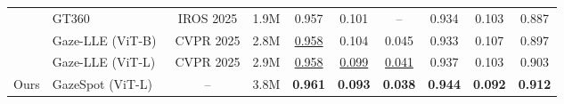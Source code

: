 \begin{table}[t]
{\begin{tabular}{llcccccccc}
    & GT360~\cite{dai2025gazetarget360} & IROS 2025 & 1.9M & 0.957 & 0.101 & -- & 0.934 & 0.103 & 0.887\\
    & Gaze-LLE (ViT-B)~\cite{ryan2025gaze} & CVPR 2025 & 2.8M & \underline{0.958} & 0.104 & 0.045 & 0.933 & 0.107 & 0.897\\
    & Gaze-LLE (ViT-L)~\cite{ryan2025gaze} & CVPR 2025 & 2.9M & \underline{0.958} & \underline{0.099} & \underline{0.041} & 0.937 & 0.103 & 0.903\\
    \midrule
    Ours & GazeSpot (ViT-L) & -- & 3.8M & \textbf{0.961} & \textbf{0.093} & \textbf{0.038} & \textbf{0.944} & \textbf{0.092} & \textbf{0.912}\\
    \bottomrule
  \end{tabular}}
\end{table}
